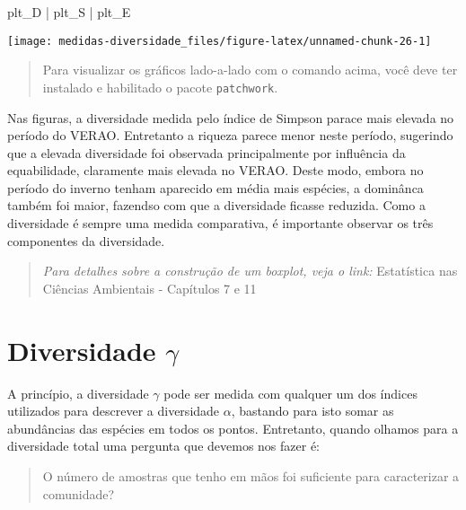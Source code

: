 \documentclass[
]{book}
\newenvironment{Shaded}{\begin{snugshade}}{\end{snugshade}}
\newcommand{\NormalTok}[1]{#1}
\newcommand{\SpecialCharTok}[1]{\textcolor[rgb]{0.00,0.00,0.00}{#1}}
\begin{document}
\begin{Shaded}
\begin{Highlighting}[]
\NormalTok{plt\_D }\SpecialCharTok{|}\NormalTok{ plt\_S }\SpecialCharTok{|}\NormalTok{ plt\_E}
\end{Highlighting}
\end{Shaded}

\begin{center}\texttt{[image: medidas-diversidade\_files/figure-latex/unnamed-chunk-26-1]} \end{center}

\begin{quote}
Para visualizar os gráficos lado-a-lado com o comando acima, você deve ter instalado e habilitado o pacote \texttt{patchwork}.
\end{quote}

Nas figuras, a diversidade medida pelo índice de Simpson parace mais elevada no período do VERAO. Entretanto a riqueza parece menor neste período, sugerindo que a elevada diversidade foi observada principalmente por influência da equabilidade, claramente mais elevada no VERAO. Deste modo, embora no período do inverno tenham aparecido em média mais espécies, a dominânca também foi maior, fazendso com que a diversidade ficasse reduzida. Como a diversidade é sempre uma medida comparativa, é importante observar os três componentes da diversidade.

\begin{quote}
\emph{Para detalhes sobre a construção de um boxplot, veja o link:} Estatística nas Ciências Ambientais - Capítulos 7 e 11
\end{quote}

\hypertarget{diversidade-gamma}{%
\section{\texorpdfstring{Diversidade \(\gamma\)}{Diversidade \textbackslash gamma}}\label{diversidade-gamma}}

A princípio, a diversidade \(\gamma\) pode ser medida com qualquer um dos índices utilizados para descrever a diversidade \(\alpha\), bastando para isto somar as abundâncias das espécies em todos os pontos. Entretanto, quando olhamos para a diversidade total uma pergunta que devemos nos fazer é:

\begin{quote}
O número de amostras que tenho em mãos foi suficiente para caracterizar a comunidade?
\end{quote}
\end{document}
